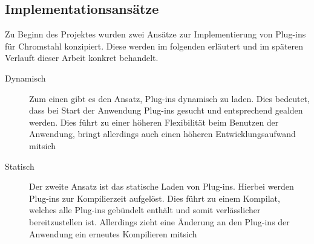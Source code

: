 \subsection{Implementationsansätze}
Zu Beginn des Projektes wurden zwei Ansätze zur Implementierung von Plug-ins für
Chromstahl konzipiert. Diese werden im folgenden erläutert und im späteren
Verlauft dieser Arbeit konkret behandelt.
\begin{description}
\item[Dynamisch]{Zum einen gibt es den Ansatz, Plug-ins dynamisch zu laden. Dies
  bedeutet, dass bei Start der Anwendung Plug-ins gesucht und entsprechend
  gealden werden. Dies führt zu einer höheren Flexibilität beim Benutzen der
  Anwendung, bringt allerdings auch einen höheren Entwicklungsaufwand mitsich}
\item[Statisch]{Der zweite Ansatz ist das statische Laden von Plug-ins. Hierbei
    werden Plug-ins zur Kompilierzeit aufgelöst. Dies führt zu einem Kompilat,
    welches alle Plug-ins gebündelt enthält und somit verlässlicher
    bereitzustellen ist. Allerdings zieht eine Änderung an den Plug-ins der
    Anwendung ein erneutes Kompilieren mitsich}
\end{description}
